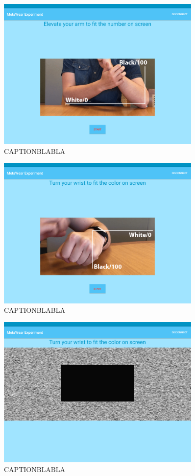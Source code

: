 \begin{figure}[h!]
\centering
\includegraphics[width=0.9\textwidth]{figures/tablet_screen12.png}
\caption{CAPTIONBLABLA}
\label{appendix_app_screen_12}
\end{figure}

\begin{figure}[h!]
\centering
\includegraphics[width=0.9\textwidth]{figures/tablet_screen13.png}
\caption{CAPTIONBLABLA}
\label{appendix_app_screen_13}
\end{figure}

\begin{figure}[h!]
\centering
\includegraphics[width=0.9\textwidth]{figures/tablet_screen14.png}
\caption{CAPTIONBLABLA}
\label{appendix_app_screen_14}
\end{figure}

